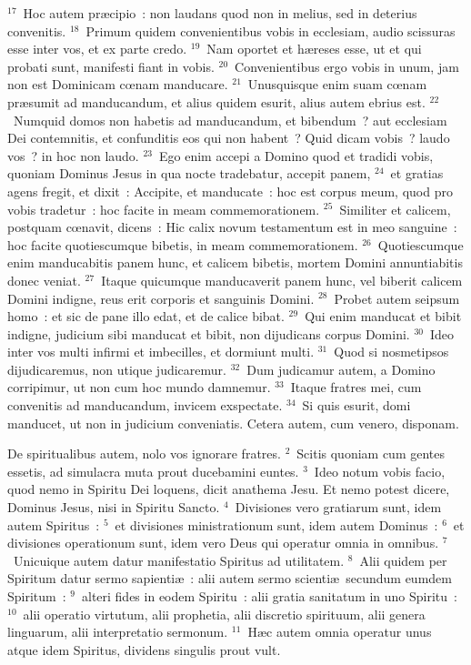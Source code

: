${}^{17}$~Hoc autem pr\ae cipio~: non laudans quod non in melius, sed in deterius convenitis.
${}^{18}$~Primum quidem convenientibus vobis in ecclesiam, audio scissuras esse inter vos, et ex parte credo.
${}^{19}$~Nam oportet et h\ae reses esse, ut et qui probati sunt, manifesti fiant in vobis.
${}^{20}$~Convenientibus ergo vobis in unum, jam non est Dominicam cœnam manducare.
${}^{21}$~Unusquisque enim suam cœnam pr\ae sumit ad manducandum, et alius quidem esurit, alius autem ebrius est.
${}^{22}$~Numquid domos non habetis ad manducandum, et bibendum~? aut ecclesiam Dei contemnitis, et confunditis eos qui non habent~? Quid dicam vobis~? laudo vos~? in hoc non laudo.
${}^{23}$~Ego enim accepi a Domino quod et tradidi vobis, quoniam Dominus Jesus in qua nocte tradebatur, accepit panem,
${}^{24}$~et gratias agens fregit, et dixit~: Accipite, et manducate~: hoc est corpus meum, quod pro vobis tradetur~: hoc facite in meam commemorationem.
${}^{25}$~Similiter et calicem, postquam cœnavit, dicens~: Hic calix novum testamentum est in meo sanguine~: hoc facite quotiescumque bibetis, in meam commemorationem.
${}^{26}$~Quotiescumque enim manducabitis panem hunc, et calicem bibetis, mortem Domini annuntiabitis donec veniat.
${}^{27}$~Itaque quicumque manducaverit panem hunc, vel biberit calicem Domini indigne, reus erit corporis et sanguinis Domini.
${}^{28}$~Probet autem seipsum homo~: et sic de pane illo edat, et de calice bibat.
${}^{29}$~Qui enim manducat et bibit indigne, judicium sibi manducat et bibit, non dijudicans corpus Domini.
${}^{30}$~Ideo inter vos multi infirmi et imbecilles, et dormiunt multi.
${}^{31}$~Quod si nosmetipsos dijudicaremus, non utique judicaremur.
${}^{32}$~Dum judicamur autem, a Domino corripimur, ut non cum hoc mundo damnemur.
${}^{33}$~Itaque fratres mei, cum convenitis ad manducandum, invicem exspectate.
${}^{34}$~Si quis esurit, domi manducet, ut non in judicium conveniatis. Cetera autem, cum venero, disponam.

\lettrine[lines=3,image=true,loversize=0.05,lraise=-0.03]{D}{}e spiritualibus autem, nolo vos ignorare fratres.
${}^{2}$~Scitis quoniam cum gentes essetis, ad simulacra muta prout ducebamini euntes.
${}^{3}$~Ideo notum vobis facio, quod nemo in Spiritu Dei loquens, dicit anathema Jesu. Et nemo potest dicere, Dominus Jesus, nisi in Spiritu Sancto.
${}^{4}$~Divisiones vero gratiarum sunt, idem autem Spiritus~:
${}^{5}$~et divisiones ministrationum sunt, idem autem Dominus~:
${}^{6}$~et divisiones operationum sunt, idem vero Deus qui operatur omnia in omnibus.
${}^{7}$~Unicuique autem datur manifestatio Spiritus ad utilitatem.
${}^{8}$~Alii quidem per Spiritum datur sermo sapienti\ae~: alii autem sermo scienti\ae\ secundum eumdem Spiritum~:
${}^{9}$~alteri fides in eodem Spiritu~: alii gratia sanitatum in uno Spiritu~:
${}^{10}$~alii operatio virtutum, alii prophetia, alii discretio spirituum, alii genera linguarum, alii interpretatio sermonum.
${}^{11}$~H\ae c autem omnia operatur unus atque idem Spiritus, dividens singulis prout vult.


